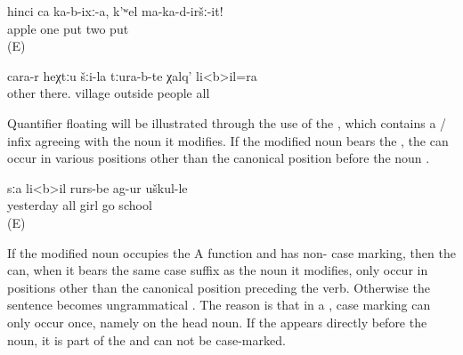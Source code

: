 \begin{exe}
		\ex	\label{ex:‎‎‎Put one apple (there), do not put two (apples)}
	\gll	hinci	ca	ka-b-ixː-a,	k'ʷel	ma-ka-d-iršː-it!\\
		apple	one	put	two	put\\
	\glt	{} (E)
	
	\ex	\label{ex:and all the people from the other villages down there}
	\gll	cara-r	heχtːu	šːi-la	tːura-b-te	χalq'	li<b>il=ra\\
		other	there.	village	outside 	people	all\\
	\glt	{}
	
\end{exe}

Quantifier floating will be illustrated through the use of the  , which contains a / infix agreeing with the noun it modifies. If the modified noun bears the , the  can occur in various positions other than the canonical position before the noun . 



\begin{exe}
	\ex	\label{ex:Yesterday all girls went to school}
	\begin{xlist}
		\ex	\label{ex:Yesterday all girls went to school@A}
		\gll	sːa	li<b>il	rurs-be	ag-ur	uškul-le\\
			yesterday	all	girl	go	school\\
		\glt	{} (E)

		\ex	{}	\label{ex:Yesterday all girls went to school@B}

		\ex	{}	\label{ex:Yesterday all girls went to school@C}

		\ex	{}	\label{ex:Yesterday all girls went to school@D}

	\end{xlist}
\end{exe}

If the modified noun occupies the A function and has non- case marking, then the  can, when it bears the same case suffix as the noun it modifies, only occur in positions other than the canonical position preceding the verb. Otherwise the sentence becomes ungrammatical . The reason is that in a , case marking can only occur once, namely on the head noun. If the  appears directly before the noun, it is part of the  and can not be case-marked.


